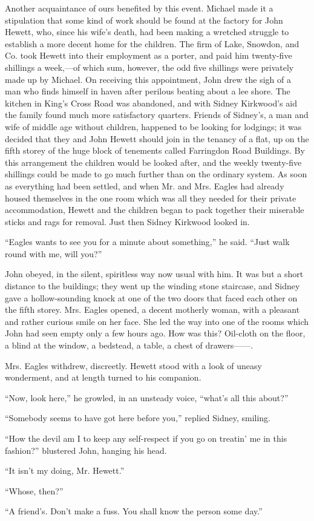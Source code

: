 Another acquaintance of ours benefited by this event. Michael made it a
stipulation that some kind of work should be found at the factory for
John Hewett, who, since his wife's death, had been making a wretched
struggle to establish a more decent home for the children. The firm of
Lake, Snowdon, and Co. took Hewett into their employment as a porter,
and paid him twenty-five shillings a week,---of which sum, however, the
odd five shillings were privately made up by Michael. On receiving this
appointment, John drew the sigh of a man who finds himself in haven
after perilous beating about a lee shore. The kitchen in King's Cross
Road was abandoned, and with Sidney Kirkwood's aid the family {}found
much more satisfactory quarters. Friends of Sidney's, a man and wife of
middle age without children, happened to be looking for lodgings; it was
decided that they and John Hewett should join in the tenancy of a flat,
up on the fifth storey of the huge block of tenements called Farringdon
Road Buildings. By this arrangement the children would be looked after,
and the weekly twenty-five shillings could be made to go much further
than on the ordinary system. As soon as everything had been settled, and
when Mr. and Mrs. Eagles had already housed themselves in the one room
which was all they needed for their private accommodation, Hewett and
the children began to pack together their miserable sticks and rags for
removal. Just then Sidney Kirkwood looked in.

``Eagles wants to see you for a minute about something,'' he said.
``Just walk round with me, will you?''

John obeyed, in the silent, spiritless way now usual with him. It was
but a short distance to the buildings; they went up the {}winding stone
staircase, and Sidney gave a hollow-sounding knock at one of the two
doors that faced each other on the fifth storey. Mrs. Eagles opened, a
decent motherly woman, with a pleasant and rather curious smile on her
face. She led the way into one of the rooms which John had seen empty
only a few hours ago. How was this? Oil-cloth on the floor, a blind at
the window, a bedstead, a table, a chest of {drawers{{------}}.}

Mrs. Eagles withdrew, discreetly. Hewett stood with a look of uneasy
wonderment, and at length turned to his companion.

``Now, look here,'' he growled, in an unsteady voice, ``what's all this
about?''

``Somebody seems to have got here before you,'' replied Sidney, smiling.

``How the devil am I to keep any self-respect if you go on treatin' me
in this fashion?'' blustered John, hanging his head.

``It isn't my doing, Mr. Hewett.''

``Whose, then?''

``A friend's. Don't make a fuss. You shall know the person some day.''
